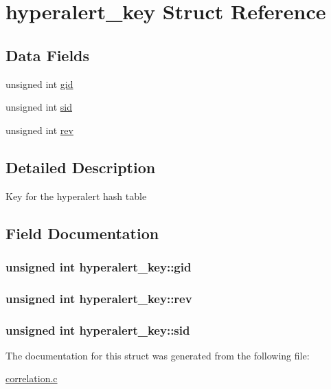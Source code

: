 \hypertarget{structhyperalert__key}{
\section{hyperalert\_\-key Struct Reference}
\label{structhyperalert__key}
}
\subsection*{Data Fields}
\begin{DoxyCompactItemize}
\item 
unsigned int \hyperlink{structhyperalert__key_aac0e30a21653be11b357e3030aafd7e4}{gid}
\item 
unsigned int \hyperlink{structhyperalert__key_ab3cb68a4bf46fab57f0dd0be007a91bc}{sid}
\item 
unsigned int \hyperlink{structhyperalert__key_a7e4a23f87bb69765c5afdb2e602aff87}{rev}
\end{DoxyCompactItemize}


\subsection{Detailed Description}
Key for the hyperalert hash table 

\subsection{Field Documentation}
\hypertarget{structhyperalert__key_aac0e30a21653be11b357e3030aafd7e4}{
\subsubsection[{gid}]{\setlength{\rightskip}{0pt plus 5cm}unsigned int {\bf hyperalert\_\-key::gid}}}
\label{structhyperalert__key_aac0e30a21653be11b357e3030aafd7e4}
\hypertarget{structhyperalert__key_a7e4a23f87bb69765c5afdb2e602aff87}{
\subsubsection[{rev}]{\setlength{\rightskip}{0pt plus 5cm}unsigned int {\bf hyperalert\_\-key::rev}}}
\label{structhyperalert__key_a7e4a23f87bb69765c5afdb2e602aff87}
\hypertarget{structhyperalert__key_ab3cb68a4bf46fab57f0dd0be007a91bc}{
\subsubsection[{sid}]{\setlength{\rightskip}{0pt plus 5cm}unsigned int {\bf hyperalert\_\-key::sid}}}
\label{structhyperalert__key_ab3cb68a4bf46fab57f0dd0be007a91bc}


The documentation for this struct was generated from the following file:\begin{DoxyCompactItemize}
\item 
\hyperlink{correlation_8c}{correlation.c}\end{DoxyCompactItemize}
